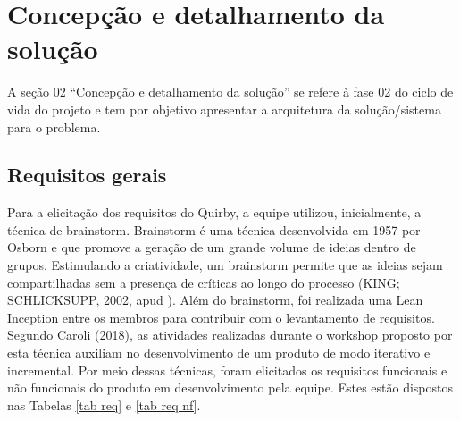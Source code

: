 \chapter{Concepção e detalhamento da solução}
A seção 02 “Concepção e detalhamento da solução” se refere à fase 02 do ciclo de vida do projeto e tem por objetivo apresentar a arquitetura da solução/sistema para o problema.
\section{Requisitos gerais}
\label{requisitos}
	Para a elicitação dos requisitos do Quirby, a equipe utilizou, inicialmente, a técnica de brainstorm. Brainstorm é uma técnica desenvolvida em 1957 por Osborn e que promove a geração de um grande volume de ideias dentro de grupos. Estimulando a criatividade, um brainstorm permite que as ideias sejam compartilhadas sem a presença de críticas ao longo do processo (KING; SCHLICKSUPP, 2002, apud \cite{INOVAÇÃO}).
	Além do brainstorm, foi realizada uma Lean Inception entre os membros para contribuir com o levantamento de requisitos. Segundo Caroli (2018), as atividades realizadas durante o workshop proposto por esta técnica auxiliam no desenvolvimento de um produto de modo iterativo e incremental. 
	Por meio dessas técnicas, foram elicitados os requisitos funcionais e não funcionais do produto em desenvolvimento pela equipe. Estes estão dispostos nas Tabelas \ref{tab req} e \ref{tab req nf}. 

